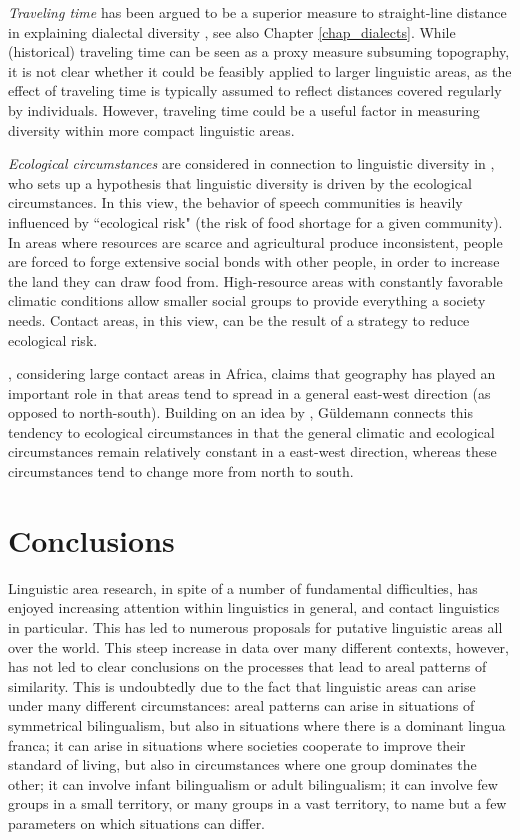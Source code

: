 \documentclass[output=paper]{langscibook}
\begin{document}
\textit{Traveling time} has been argued to be a superior measure to straight-line distance in explaining dialectal diversity \parencite{gooskens2005}, see also  Chapter \ref{chap_dialects}.
While (historical) traveling time can be seen as a proxy measure subsuming topography, it is not clear whether it could be feasibly applied to larger linguistic areas, as the effect of traveling time is typically assumed to reflect distances covered regularly by individuals. However, traveling time could be a useful factor in measuring diversity within more compact linguistic areas.

\textit{Ecological circumstances} are considered in connection to linguistic diversity in  \textcite{nettle1999linguistic}, who sets up a hypothesis that linguistic diversity is driven by the ecological circumstances. In this view, the behavior of speech communities is heavily influenced by ``ecological risk" (the risk of food shortage for a given community). In areas where resources are scarce and agricultural produce inconsistent, people are forced to forge extensive social bonds with other people, in order to increase the land they can draw food from. High-resource areas with constantly favorable climatic conditions allow smaller social groups to provide everything a society needs. Contact areas, in this view, can be the result of a strategy to reduce ecological risk. 

\textcite{gueldemann2011sprachraum}, considering large contact areas in Africa, claims that geography has played an important role in that areas tend to spread in a general east-west direction (as opposed to north-south). Building on an idea by \textcite{diamond1997guns}, Güldemann connects this tendency to ecological circumstances in that the general climatic and ecological circumstances remain relatively constant in a east-west direction, whereas these circumstances tend to change more from north to south.


\section{Conclusions}

Linguistic area research, in spite of a number of fundamental difficulties, has enjoyed increasing attention within linguistics in general, and contact linguistics in particular. This has led to numerous proposals for putative linguistic areas all over the world. This steep increase in data over many different contexts, however, has not led to clear conclusions on the processes that lead to areal patterns of similarity. This is undoubtedly due to the fact that linguistic areas can arise under many different circumstances: areal patterns can arise in situations of symmetrical bilingualism, but also in situations where there is a dominant lingua franca; it can arise in situations where societies cooperate to improve their standard of living, but also in circumstances where one group dominates the other; it can involve infant bilingualism or adult bilingualism; it can involve few groups in a small territory, or many groups in a vast territory, to name but a few parameters on which situations can differ.
\end{document}
